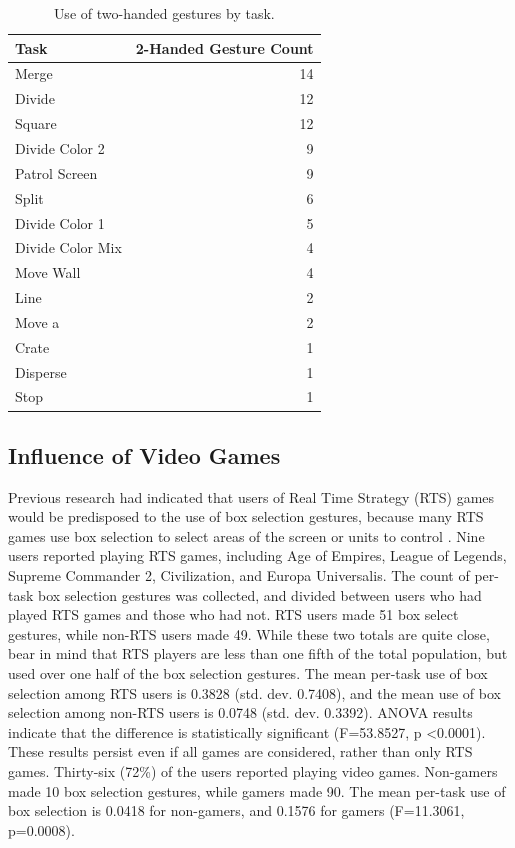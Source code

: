 \begin{table}
	\centering
	\begin{tabular}{l r}
		Task & 2-Handed Gesture Count\\
		\hline
		Merge&14\\
		Divide&12\\
		Square&12\\
		Divide Color 2&9\\
		Patrol Screen&9\\
		Split&6\\
		Divide Color 1&5\\
		Divide Color Mix&4\\
		Move Wall&4\\
		Line&2\\
		Move a&2\\
		Crate&1\\
		Disperse&1\\
		Stop&1
	\end{tabular}
	\caption{Use of two-handed gestures by task.}
\end{table}

\subsection{Influence of Video Games}

Previous research had indicated that users of Real Time Strategy (RTS) games would be predisposed to the use of box selection gestures, because many RTS games use box selection to select areas of the screen or units to control \citep{micire2010multi}. 
Nine users reported playing RTS games, including Age of Empires, League of Legends, Supreme Commander 2, Civilization, and Europa Universalis. 
The count of per-task box selection gestures was collected, and divided between users who had played RTS games and those who had not. 
RTS users made 51 box select gestures, while non-RTS users made 49.
While these two totals are quite close, bear in mind that RTS players are less than one fifth of the total population, but used over one half of the box selection gestures. 
The mean per-task use of box selection among RTS users is 0.3828 (std. dev. 0.7408), and the mean use of box selection among non-RTS users is 0.0748 (std. dev. 0.3392). 
ANOVA results indicate that the difference is statistically significant (F=53.8527, p \textless 0.0001).
These results persist even if all games are considered, rather than only RTS games.
Thirty-six (72\%) of the users reported playing video games.
Non-gamers made 10 box selection gestures, while gamers made 90. 
The mean per-task use of box selection is 0.0418 for non-gamers, and 0.1576 for gamers (F=11.3061, p=0.0008).


